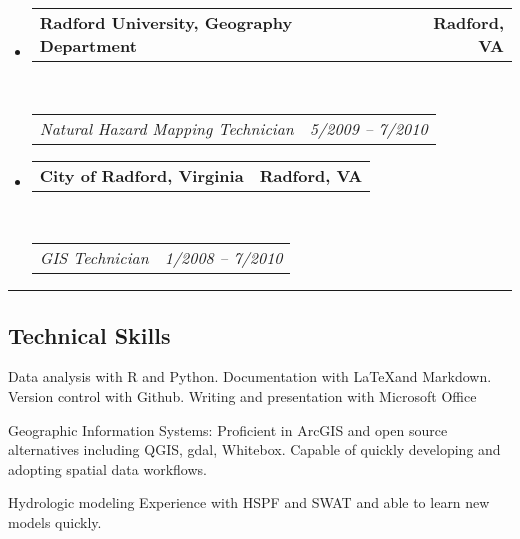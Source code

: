 \documentclass[10pt,letterpaper]{article}
\makeatletter
\newenvironment{indentsection}[1]%
{\begin{list}{}%
		{\setlength{\leftmargin}{#1}}%
		\item[]%
	}
	{\end{list}}
\newcommand{\headerrow}[2]
{\begin{tabular*}{\linewidth}{l@{\extracolsep{\fill}}r}
		#1 &
		#2 \\
\end{tabular*}}
\makeatother
\begin{document}
\begin{itemize}
\begin{itemize*}
		\end{itemize*}
		
		\item
		\headerrow
		{\textbf{Radford University, Geography Department}}
		{\textbf{Radford, VA}}
		\\
		\headerrow
		{\emph{Natural Hazard Mapping Technician}}
		{\emph{5/2009 -- 7/2010}}
		
		\item
		\headerrow
		{\textbf{City of Radford, Virginia}}
		{\textbf{Radford, VA}}
		\\
		\headerrow
		{\emph{GIS Technician}}
		{\emph{1/2008 -- 7/2010}}
		
	\end{itemize}
	
	\hrule
	\vspace{-0.4em}
	\subsection*{Technical Skills}
	
	\begin{indentsection}{\parindent}
		\begin{description*}
			\item[]
			Data analysis with R and Python. Documentation with \LaTeX and Markdown. Version control with Github. Writing and presentation with Microsoft Office
			\item[Geographic Information Systems:]
			Proficient in ArcGIS and open source alternatives including QGIS, gdal, Whitebox. Capable of quickly developing and adopting spatial data workflows.
			\item[Hydrologic modeling]
			Experience with HSPF and SWAT and able to learn new models quickly.
		\end{description*}
	\end{indentsection}
	
\end{document}
